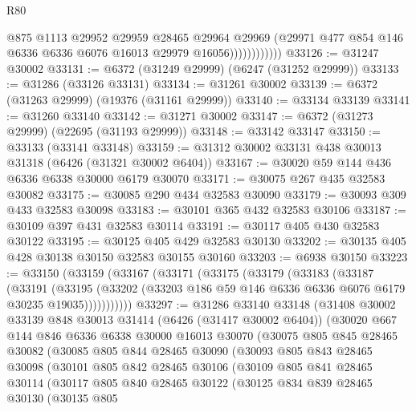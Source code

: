 \begin{lexlean}{R80}
\begin{coremodule}
                          @875
                          @1113
                          @29952
                          @29959
                          @28465
                          @29964
                          @29969
                          (@29971 @477 @854 @146 @6336 @6336 @6076 @16013 @29979 @16056))))))))))))
@33126 := @31247 @30002
@33131 := @6372 (@31249 @29999) (@6247 (@31252 @29999))
@33133 := @31286 (@33126 @33131)
@33134 := @31261 @30002
@33139 := @6372 (@31263 @29999) (@19376 (@31161 @29999))
@33140 := @33134 @33139
@33141 := @31260 @33140
@33142 := @31271 @30002
@33147 := @6372 (@31273 @29999) (@22695 (@31193 @29999))
@33148 := @33142 @33147
@33150 := @33133 (@33141 @33148)
@33159 := @31312 @30002 @33131 @438 @30013 @31318 (@6426 (@31321 @30002 @6404))
@33167 := @30020 @59 @144 @436 @6336 @6338 @30000 @6179 @30070
@33171 := @30075 @267 @435 @32583 @30082
@33175 := @30085 @290 @434 @32583 @30090
@33179 := @30093 @309 @433 @32583 @30098
@33183 := @30101 @365 @432 @32583 @30106
@33187 := @30109 @397 @431 @32583 @30114
@33191 := @30117 @405 @430 @32583 @30122
@33195 := @30125 @405 @429 @32583 @30130
@33202 := @30135 @405 @428 @30138 @30150 @32583 @30155 @30160
@33203 := @6938 @30150
@33223 := @33150
    (@33159
      (@33167
        (@33171
          (@33175
            (@33179
              (@33183
                (@33187
                  (@33191
                    (@33195
                      (@33202 (@33203 @186 @59 @146 @6336 @6336 @6076 @6179 @30235 @19035)))))))))))
@33297 := @31286
    @33140
    @33148
    (@31408
      @30002
      @33139
      @848
      @30013
      @31414
      (@6426 (@31417 @30002 @6404))
      (@30020
        @667
        @144
        @846
        @6336
        @6338
        @30000
        @16013
        @30070
        (@30075
          @805
          @845
          @28465
          @30082
          (@30085
            @805
            @844
            @28465
            @30090
            (@30093
              @805
              @843
              @28465
              @30098
              (@30101
                @805
                @842
                @28465
                @30106
                (@30109
                  @805
                  @841
                  @28465
                  @30114
                  (@30117
                    @805
                    @840
                    @28465
                    @30122
                    (@30125
                      @834
                      @839
                      @28465
                      @30130
                      (@30135
                        @805

\end{coremodule}
\end{lexlean}
